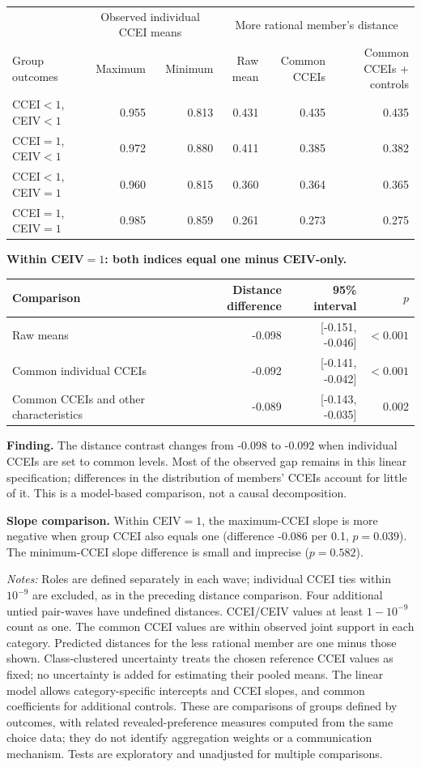 \documentclass[11pt]{article}
\begin{document}
\begin{center}\begin{tabular}{lrrrrr}\toprule
& \multicolumn{2}{c}{Observed individual CCEI means} & \multicolumn{3}{c}{More rational member's distance}\\
Group outcomes & Maximum & Minimum & Raw mean & Common CCEIs & Common CCEIs + controls\\\midrule
CCEI$<1$, CEIV$<1$ & 0.955 & 0.813 & 0.431 & 0.435 & 0.435\\
CCEI$=1$, CEIV$<1$ & 0.972 & 0.880 & 0.411 & 0.385 & 0.382\\
CCEI$<1$, CEIV$=1$ & 0.960 & 0.815 & 0.360 & 0.364 & 0.365\\
CCEI$=1$, CEIV$=1$ & 0.985 & 0.859 & 0.261 & 0.273 & 0.275\\
\bottomrule\end{tabular}\end{center}
\textbf{Within CEIV$=1$: both indices equal one minus CEIV-only.}
\begin{center}\begin{tabular}{lrrr}\toprule
Comparison & Distance difference & 95\% interval & $p$\\\midrule
Raw means & -0.098 & [-0.151, -0.046] & $<0.001$\\
Common individual CCEIs & -0.092 & [-0.141, -0.042] & $<0.001$\\
Common CCEIs and other characteristics & -0.089 & [-0.143, -0.035] & 0.002\\
\bottomrule\end{tabular}\end{center}
\textbf{Finding.} The distance contrast changes from -0.098 to -0.092 when individual CCEIs are set to common levels. Most of the observed gap remains in this linear specification; differences in the distribution of members' CCEIs account for little of it. This is a model-based comparison, not a causal decomposition.

\textbf{Slope comparison.} Within CEIV$=1$, the maximum-CCEI slope is more negative when group CCEI also equals one (difference -0.086 per 0.1, $p=0.039$). The minimum-CCEI slope difference is small and imprecise ($p=0.582$).

\footnotesize
\textit{Notes:} Roles are defined separately in each wave; individual CCEI ties within $10^{-9}$ are excluded, as in
the preceding distance comparison. Four additional untied pair-waves have undefined distances. CCEI/CEIV values at
least $1-10^{-9}$ count as one. The common CCEI values are within observed joint support in each category. Predicted
distances for the less rational member are one minus those shown. Class-clustered uncertainty treats the chosen
reference CCEI values as fixed; no uncertainty is added for estimating their pooled means. The linear model allows
category-specific intercepts and CCEI slopes, and common coefficients for additional controls. These are comparisons
of groups defined by outcomes, with related revealed-preference measures computed from the same choice data;
they do not identify aggregation weights or a communication mechanism. Tests are exploratory and unadjusted for
multiple comparisons.
\end{document}

